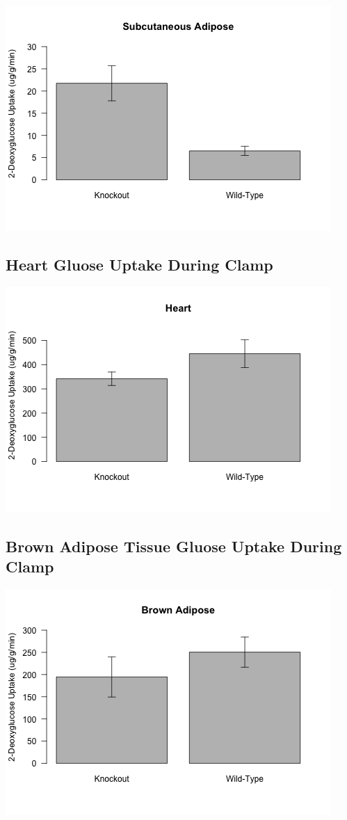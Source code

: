 \documentclass[]{article}
\begin{document}
\includegraphics{figures/s-fat-1.png}

\subsection{Heart Gluose Uptake During
Clamp}\label{heart-gluose-uptake-during-clamp}

\includegraphics{figures/heart-1.png}

\subsection{Brown Adipose Tissue Gluose Uptake During
Clamp}\label{brown-adipose-tissue-gluose-uptake-during-clamp}

\includegraphics{figures/bat-1.png}
\end{document}
